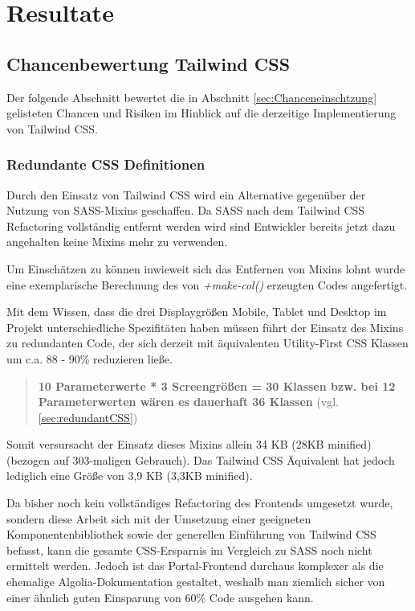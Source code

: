 \chapter{Resultate}
\label{cha:Ergebnisse}

\section{Chancenbewertung Tailwind CSS}
Der folgende Abschnitt bewertet die in Abschnitt \ref{sec:Chanceneinschtzung} gelisteten Chancen und Risiken im Hinblick auf die derzeitige Implementierung von Tailwind CSS.
\subsection{Redundante CSS Definitionen}
\label{subsec:redundantCSS}
Durch den Einsatz von Tailwind CSS wird ein Alternative gegenüber der Nutzung von SASS-Mixins geschaffen. Da SASS nach dem Tailwind CSS Refactoring vollständig entfernt werden wird sind Entwickler bereits jetzt dazu angehalten keine Mixins mehr zu verwenden.

Um Einschätzen zu können inwieweit sich das Entfernen von Mixins lohnt wurde eine exemplarische Berechnung des von \textit{+make-col()} erzeugten Codes angefertigt.

Mit dem Wissen, dass die drei Displaygrößen Mobile, Tablet und Desktop im Projekt unterschiedliche Spezifitäten haben müssen führt der Einsatz des Mixins zu redundanten Code, der sich derzeit mit äquivalenten Utility-First CSS Klassen um c.a. 88 - 90\% reduzieren ließe. 

\begin{quotation}
	\textbf{10 Parameterwerte * 3 Screengrößen = 30 Klassen bzw. bei 12 Parameterwerten wären es dauerhaft 36 Klassen} (vgl. \ref{sec:redundantCSS})
\end{quotation}

Somit versursacht der Einsatz dieses Mixins allein 34 KB (28KB minified) (bezogen auf 303-maligen Gebrauch). Das Tailwind CSS Äquivalent hat jedoch lediglich eine Größe von 3,9 KB (3,3KB minified).

Da bisher noch kein vollständiges Refactoring des Frontends umgesetzt wurde, sondern diese Arbeit sich mit der Umsetzung einer geeigneten Komponentenbibliothek sowie der generellen Einführung von Tailwind CSS befasst, kann die gesamte CSS-Ersparnis im Vergleich zu SASS noch nicht ermittelt werden. Jedoch ist das Portal-Frontend durchaus komplexer als die ehemalige Algolia-Dokumentation \citep{AlgoliaTailwindBlog} gestaltet, weshalb man ziemlich sicher von einer ähnlich guten Einsparung von 60\% Code ausgehen kann.


